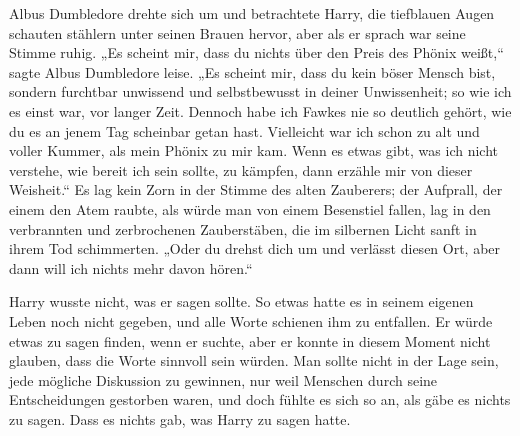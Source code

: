 Albus Dumbledore drehte sich um und betrachtete Harry, die tiefblauen Augen schauten stählern unter seinen Brauen hervor, aber als er sprach war seine Stimme ruhig. „Es scheint mir, dass du nichts über den Preis des Phönix weißt,“ sagte Albus Dumbledore leise. „Es scheint mir, dass du kein böser Mensch bist, sondern furchtbar unwissend und selbstbewusst in deiner Unwissenheit; so wie ich es einst war, vor langer Zeit. Dennoch habe ich Fawkes nie so deutlich gehört, wie du es an jenem Tag scheinbar getan hast. Vielleicht war ich schon zu alt und voller Kummer, als mein Phönix zu mir kam. Wenn es etwas gibt, was ich nicht verstehe, wie bereit ich sein sollte, zu kämpfen, dann erzähle mir von dieser Weisheit.“ Es lag kein Zorn in der Stimme des alten Zauberers; der Aufprall, der einem den Atem raubte, als würde man von einem Besenstiel fallen, lag in den verbrannten und zerbrochenen Zauberstäben, die im silbernen Licht sanft in ihrem Tod schimmerten. „Oder du drehst dich um und verlässt diesen Ort, aber dann will ich nichts mehr davon hören.“

Harry wusste nicht, was er sagen sollte. So etwas hatte es in seinem eigenen Leben noch nicht gegeben, und alle Worte schienen ihm zu entfallen. Er würde etwas zu sagen finden, wenn er suchte, aber er konnte in diesem Moment nicht glauben, dass die Worte sinnvoll sein würden. Man sollte nicht in der Lage sein, jede mögliche Diskussion zu gewinnen, nur weil Menschen durch seine Entscheidungen gestorben waren, und doch fühlte es sich so an, als gäbe es nichts zu sagen. Dass es nichts gab, was Harry zu sagen hatte.

